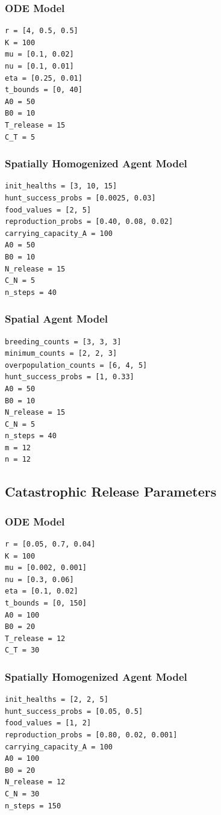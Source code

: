\documentclass[journal]{IEEEtran}
\begin{document}
\subsubsection{ODE Model}
\begin{verbatim}
r = [4, 0.5, 0.5]
K = 100
mu = [0.1, 0.02]
nu = [0.1, 0.01]
eta = [0.25, 0.01]
t_bounds = [0, 40]
A0 = 50
B0 = 10
T_release = 15
C_T = 5
\end{verbatim}
\subsubsection{Spatially Homogenized Agent Model}
\begin{verbatim}
init_healths = [3, 10, 15]
hunt_success_probs = [0.0025, 0.03]
food_values = [2, 5]
reproduction_probs = [0.40, 0.08, 0.02]
carrying_capacity_A = 100
A0 = 50
B0 = 10
N_release = 15
C_N = 5
n_steps = 40
\end{verbatim}
\subsubsection{Spatial Agent Model}
\begin{verbatim}
breeding_counts = [3, 3, 3]
minimum_counts = [2, 2, 3]
overpopulation_counts = [6, 4, 5]
hunt_success_probs = [1, 0.33]
A0 = 50
B0 = 10
N_release = 15
C_N = 5
n_steps = 40
m = 12
n = 12
\end{verbatim}

\subsection{Catastrophic Release Parameters}
\subsubsection{ODE Model}
\begin{verbatim}
r = [0.05, 0.7, 0.04]
K = 100
mu = [0.002, 0.001]
nu = [0.3, 0.06]
eta = [0.1, 0.02]
t_bounds = [0, 150]
A0 = 100
B0 = 20
T_release = 12
C_T = 30
\end{verbatim}
\subsubsection{Spatially Homogenized Agent Model}
\begin{verbatim}
init_healths = [2, 2, 5]
hunt_success_probs = [0.05, 0.5]
food_values = [1, 2]
reproduction_probs = [0.80, 0.02, 0.001]
carrying_capacity_A = 100
A0 = 100
B0 = 20
N_release = 12
C_N = 30
n_steps = 150
\end{verbatim}
\end{document}
